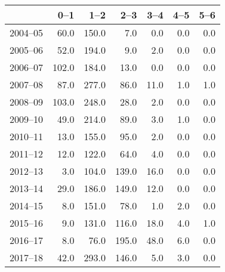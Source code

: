 \begin{table}[ht]
\centering
\begin{tabular}{rrrrrrr}
  \hline
 & 0--1 & 1--2 & 2--3 & 3--4 & 4--5 & 5--6 \\ 
  \hline
2004--05 & 60.0 & 150.0 & 7.0 & 0.0 & 0.0 & 0.0 \\ 
  2005--06 & 52.0 & 194.0 & 9.0 & 2.0 & 0.0 & 0.0 \\ 
  2006--07 & 102.0 & 184.0 & 13.0 & 0.0 & 0.0 & 0.0 \\ 
  2007--08 & 87.0 & 277.0 & 86.0 & 11.0 & 1.0 & 1.0 \\ 
  2008--09 & 103.0 & 248.0 & 28.0 & 2.0 & 0.0 & 0.0 \\ 
  2009--10 & 49.0 & 214.0 & 89.0 & 3.0 & 1.0 & 0.0 \\ 
  2010--11 & 13.0 & 155.0 & 95.0 & 2.0 & 0.0 & 0.0 \\ 
  2011--12 & 12.0 & 122.0 & 64.0 & 4.0 & 0.0 & 0.0 \\ 
  2012--13 & 3.0 & 104.0 & 139.0 & 16.0 & 0.0 & 0.0 \\ 
  2013--14 & 29.0 & 186.0 & 149.0 & 12.0 & 0.0 & 0.0 \\ 
  2014--15 & 8.0 & 151.0 & 78.0 & 1.0 & 2.0 & 0.0 \\ 
  2015--16 & 9.0 & 131.0 & 116.0 & 18.0 & 4.0 & 1.0 \\ 
  2016--17 & 8.0 & 76.0 & 195.0 & 48.0 & 6.0 & 0.0 \\ 
  2017--18 & 42.0 & 293.0 & 146.0 & 5.0 & 3.0 & 0.0 \\ 
   \hline
\end{tabular}
\end{table}
